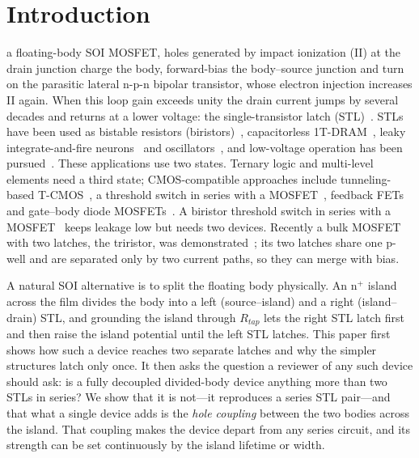 \documentclass[journal]{IEEEtran}
\begin{document}
\section{Introduction}
 a floating-body SOI MOSFET, holes generated by impact ionization (II) at the drain junction charge the body, forward-bias the body--source junction and turn on the parasitic lateral n-p-n bipolar transistor, whose electron injection increases II again. When this loop gain exceeds unity the drain current jumps by several decades and returns at a lower voltage: the single-transistor latch (STL)~\cite{chen_stl}. STLs have been used as bistable resistors (biristors)~\cite{han_biristor}, capacitorless 1T-DRAM~\cite{kim_1tdram,moon_fin}, leaky integrate-and-fire neurons~\cite{han_lif,han_mimic,han_sciadv} and oscillators~\cite{kim_osc}, and low-voltage operation has been pursued~\cite{lee_1v}. These applications use two states. Ternary logic and multi-level elements need a third state; CMOS-compatible approaches include tunneling-based T-CMOS~\cite{jeong_tcmos}, a threshold switch in series with a MOSFET~\cite{heo_nbo2,han_bts,han_ptmos}, feedback FETs~\cite{son_fbfet} and gate--body diode MOSFETs~\cite{kim_spti}. A biristor threshold switch in series with a MOSFET~\cite{han_bts,han_ptmos} keeps leakage low but needs two devices. Recently a bulk MOSFET with two latches, the triristor, was demonstrated~\cite{noh_triristor}; its two latches share one p-well and are separated only by two current paths, so they can merge with bias.

A natural SOI alternative is to split the floating body physically. An n$^+$ island across the film divides the body into a left (source--island) and a right (island--drain) STL, and grounding the island through $R_{tap}$ lets the right STL latch first and then raise the island potential until the left STL latches. This paper first shows how such a device reaches two separate latches and why the simpler structures latch only once. It then asks the question a reviewer of any such device should ask: is a fully decoupled divided-body device anything more than two STLs in series? We show that it is not---it reproduces a series STL pair---and that what a single device adds is the \textit{hole coupling} between the two bodies across the island. That coupling makes the device depart from any series circuit, and its strength can be set continuously by the island lifetime or width.
\end{document}

